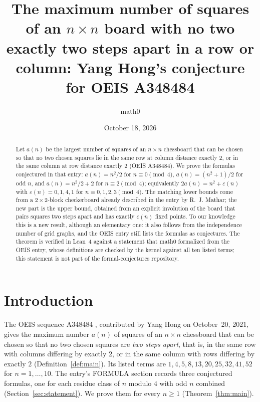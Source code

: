 \documentclass[11pt]{amsart}
\title[No two squares two steps apart in a row or column]{The maximum number of squares of an $n\times n$ board with no two exactly two steps apart in a row or column: Yang Hong's conjecture for OEIS A348484}
\author{math0}
\date{October 18, 2026}
\theoremstyle{plain}
\theoremstyle{definition}
\begin{document}
\begin{abstract}
Let $a(n)$ be the largest number of squares of an $n\times n$ chessboard that can be chosen so that no two chosen squares lie in the same row at column distance exactly $2$, or in the same column at row distance exactly $2$ (OEIS A348484).
We prove the formulas conjectured in that entry: $a(n)=n^2/2$ for $n\equiv0\pmod 4$, $a(n)=(n^2+1)/2$ for odd $n$, and $a(n)=n^2/2+2$ for $n\equiv2\pmod4$; equivalently $2a(n)=n^2+\varepsilon(n)$ with $\varepsilon(n)=0,1,4,1$ for $n\equiv0,1,2,3\pmod 4$.
The matching lower bounds come from a $2\times2$-block checkerboard already described in the entry by R.~J. Mathar; the new part is the upper bound, obtained from an explicit involution of the board that pairs squares two steps apart and has exactly $\varepsilon(n)$ fixed points.
To our knowledge this is a new result, although an elementary one: it also follows from the independence number of grid graphs, and the OEIS entry still lists the formulas as conjectures.
The theorem is verified in Lean~4 against a statement that math0 formalized from the OEIS entry, whose definitions are checked by the kernel against all ten listed terms; this statement is not part of the formal-conjectures repository.
\end{abstract}
\maketitle

\section{Introduction}

The OEIS sequence A348484 \cite{A348484}, contributed by Yang Hong on October~20, 2021, gives the maximum number $a(n)$ of squares of an $n\times n$ chessboard that can be chosen so that no two chosen squares are \emph{two steps apart}, that is, in the same row with columns differing by exactly $2$, or in the same column with rows differing by exactly $2$ (Definition~\ref{def:main}).
Its listed terms are $1,4,5,8,13,20,25,32,41,52$ for $n=1,\dots,10$.
The entry's FORMULA section records three conjectured formulas, one for each residue class of $n$ modulo $4$ with odd $n$ combined (Section~\ref{sec:statement}).
We prove them for every $n\ge1$ (Theorem~\ref{thm:main}).
\end{document}
